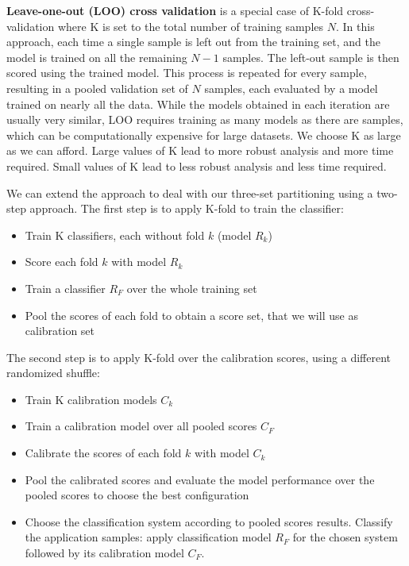 \textbf{Leave-one-out (LOO) cross validation} is a special case of K-fold cross-validation where K is set to the total number of training samples $N$. In this approach, each time a single sample is left out from the training set, and the model is trained on all the remaining $N-1$ samples. The left-out sample is then scored using the trained model. This process is repeated for every sample, resulting in a pooled validation set of $N$ samples, each evaluated by a model trained on nearly all the data. While the models obtained in each iteration are usually very similar, LOO requires training as many models as there are samples, which can be computationally expensive for large datasets. We choose K as large as we can afford. Large values of K lead to more robust analysis and more time required. Small values of K lead to less robust analysis and less time required.

We can extend the approach to deal with our three-set partitioning using a two-step approach. The first step is to apply K-fold to train the classifier:
\begin{itemize}
	\item Train K classifiers, each without fold $k$ (model $R_k$)
	\item Score each fold $k$ with model $R_k$
	\item Train a classifier $R_F$ over the whole training set
	\item Pool the scores of each fold to obtain a score set, that we will use as calibration set
\end{itemize}

The second step is to apply K-fold over the calibration scores, using a different randomized shuffle:
\begin{itemize}
	\item Train K calibration models $C_k$
	\item Train a calibration model over all pooled scores $C_F$
	\item Calibrate the scores of each fold $k$ with model $C_k$
	\item Pool the calibrated scores and evaluate the model performance over the pooled scores to choose the best configuration
	\item Choose the classification system according to pooled scores results. Classify the application samples: apply classification model $R_F$ for the chosen system followed by its calibration model $C_F$.
\end{itemize}

